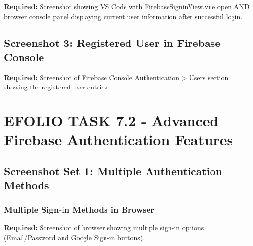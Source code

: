 \documentclass[11pt,a4paper]{article}
\begin{document}
\textbf{Required:} Screenshot showing VS Code with FirebaseSigninView.vue open AND browser console panel displaying current user information after successful login.

\subsection{Screenshot 3: Registered User in Firebase Console}


\textbf{Required:} Screenshot of Firebase Console Authentication > Users section showing the registered user entries.

\newpage


\section{EFOLIO TASK 7.2 - Advanced Firebase Authentication Features}

\subsection{Screenshot Set 1: Multiple Authentication Methods}

\subsubsection{Multiple Sign-in Methods in Browser}


\textbf{Required:} Screenshot of browser showing multiple sign-in options (Email/Password and Google Sign-in buttons).
\end{document}
